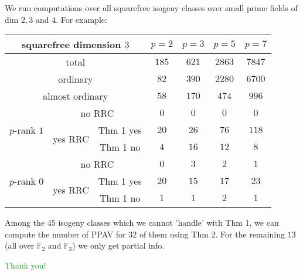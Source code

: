 \documentclass[usenames,dvipsnames,handout]{beamer}
\def\F{\mathbb{F}}
\newcommand{\green}[1]{\textcolor{ForestGreen}{#1}}
\begin{document}
\begin{frame}{ }
	We run computations over all squarefree isogeny classes over small prime fields of dim $2,3$ and $4$. 
	\pause For example:
	\begin{table}[ht]
	    \centering
	    \small
	    \begin{tabular}{|c|c|c|c|c|c|c|}\hline
	\multicolumn{3}{|c|}{squarefree dimension $3$}                  & $p=2$ & $p=3$ & $p=5$ & $p=7$ \\\hline
	\multicolumn{3}{|c|}{total}                                     & $185$ & $621$  & $2863$ & $7847$ \\\hline                    
	\multicolumn{3}{|c|}{ordinary}                                  & $82$ & $390$  & $2280$  & $6700$ \\\hline
	\multicolumn{3}{|c|}{almost ordinary}                           & $58$ & $170$  & $474$  & $996$  \\\hline
	\multirow{3}{*}{$p$-rank $1$} & \multicolumn{2}{|c|}{no RRC}    & $0$ & $0$   & $0$   & $0$   \\\cline{2-7}
	                              & \multirow{2}{*}{yes RRC} & Thm 1 yes & $20$ & $26$   & $76$   & $118$   \\\cline{3-7}
	                              &                          & Thm 1 no  & $4$ & $16$   & $12$   & $8$   \\\hline
	\multirow{3}{*}{$p$-rank $0$}   & \multicolumn{2}{|c|}{no RRC}    & $0$ & $3$   & $2$   & $1$   \\\cline{2-7}
	                              & \multirow{2}{*}{yes RRC} & Thm 1 yes & $20$ & $15$   & $17$   & $23$   \\\cline{3-7}
	                              &                          & Thm 1 no  & $1$ & $1$   & $2$   & $1$   \\\hline                              
	    \end{tabular}
	\end{table}
    \pause Among the $45$ isogeny classes which we cannot 'handle' with Thm 1, we can compute the number of PPAV for $32$ of them using Thm 2. For the remaining $13$ (all over $\F_2$ and $\F_3$) we only get partial info.
\end{frame}


\begin{frame}{ }
\begin{center}
\green{\huge Thank you!}
\end{center}
\end{frame}
\end{document}
